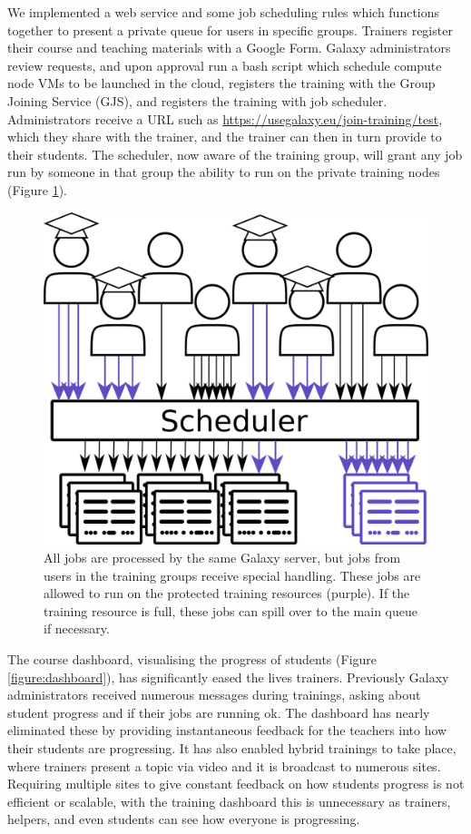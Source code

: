 \documentclass[a4paper,num-refs]{oup-contemporary}
\begin{document}
We implemented a web service and some job scheduling rules which functions together to present a private queue for users in specific groups. Trainers register their course and teaching materials with a Google Form. Galaxy administrators review requests, and upon approval run a bash script which schedule compute node VMs to be launched in the cloud, registers the training with the Group Joining Service (GJS), and registers the training with job scheduler. Administrators receive a URL such as \url{https://usegalaxy.eu/join-training/test}, which they share with the trainer, and the trainer can then in turn provide to their students. The scheduler, now aware of the training group, will grant any job run by someone in that group the ability to run on the private training nodes (Figure \ref{figure:queue}).

\begin{figure}[bt!]
\centering
\includegraphics[width=\linewidth]{images/rules.png}
\caption{All jobs are processed by the same Galaxy server, but jobs from users in the training groups receive special handling. These jobs are allowed to run on the protected training resources (purple). If the training resource is full, these jobs can spill over to the main queue if necessary.}\label{figure:queue}
\end{figure}

The course dashboard, visualising the progress of students (Figure \ref{figure:dashboard}), has significantly eased the lives trainers. Previously Galaxy administrators received numerous messages during trainings, asking about student progress and if their jobs are running ok. The dashboard has nearly eliminated these by providing instantaneous feedback for the teachers into how their students are progressing. It has also enabled hybrid trainings to take place, where trainers present a topic via video and it is broadcast to numerous sites. Requiring multiple sites to give constant feedback on how students progress is not efficient or scalable, with the training dashboard this is unnecessary as trainers, helpers, and even students can see how everyone is progressing.
\end{document}
